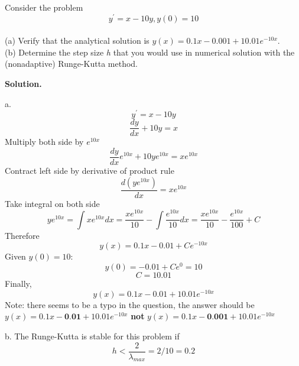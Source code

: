 \begin{exercise}{5} %
Consider the problem $$ y^\prime = x-10y, y(0) = 10 $$ \\
(a) Verify that the analytical solution is $y(x) = 0.1x-0.001 + 10.01e^{-10x}$.\\ (b) Determine the step size \textit{h} that you would use in numerical solution with the (nonadaptive) Runge-Kutta method.

\textbf{Solution.}

a. $$y^\prime = x-10y$$
$$\frac{dy}{dx} + 10y = x$$
Multiply both side by $e^{10x}$    
$$\frac{dy}{dx}e^{10x} + 10ye^{10x} = xe^{10x}$$
Contract left side by derivative of product rule
$$\frac{d(ye^{10x})}{dx} = xe^{10x}$$
Take integral on both side
$$ye^{10x}=\int xe^{10x}dx=\frac{xe^{10x}}{10} - \int \frac{e^{10x}}{10}dx = 
\frac{xe^{10x}}{10} - \frac{e^{10x}}{100} + C$$
Therefore
$$y(x)=0.1x-0.01 + Ce^{-10x}$$
Given $y(0) = 10$:
$$y(0)=-0.01 + Ce^0=10$$
$$C=10.01$$
Finally,
$$y(x)=0.1x-0.01 + 10.01e^{-10x}$$
Note: there seems to be a typo in the question, the answer should be $y(x)=0.1x-\textbf{0.01} + 10.01e^{-10x}$ \textbf{not} $y(x)=0.1x-\textbf{0.001} + 10.01e^{-10x}$

b. The Runge-Kutta is stable for this problem if
$$h<\frac{2}{\lambda_{max}}=2/10=0.2$$
\end{exercise}


